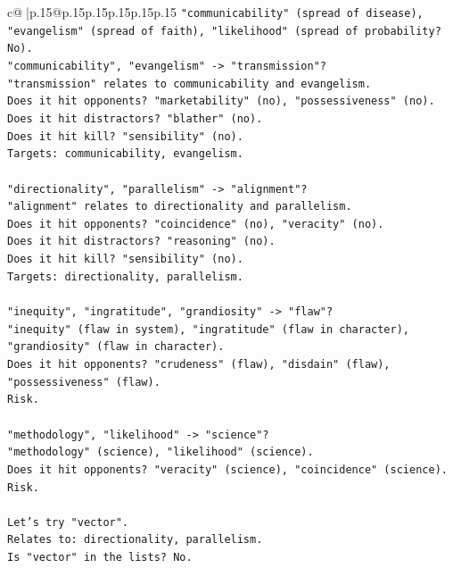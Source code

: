 \documentclass{article}
\begin{document}
{\begin{supertabular}{c@{$\;$}|p{.15\linewidth}@{}p{.15\linewidth}p{.15\linewidth}p{.15\linewidth}p{.15\linewidth}p{.15\linewidth}}
{{{\texttt{"communicability" (spread of disease), "evangelism" (spread of faith), "likelihood" (spread of probability? No).} \\
\texttt{"communicability", "evangelism" {-}> "transmission"?} \\
\texttt{"transmission" relates to communicability and evangelism.} \\
\texttt{Does it hit opponents? "marketability" (no), "possessiveness" (no).} \\
\texttt{Does it hit distractors? "blather" (no).} \\
\texttt{Does it hit kill? "sensibility" (no).} \\
\texttt{Targets: communicability, evangelism.} \\
\\ 
\texttt{"directionality", "parallelism" {-}> "alignment"?} \\
\texttt{"alignment" relates to directionality and parallelism.} \\
\texttt{Does it hit opponents? "coincidence" (no), "veracity" (no).} \\
\texttt{Does it hit distractors? "reasoning" (no).} \\
\texttt{Does it hit kill? "sensibility" (no).} \\
\texttt{Targets: directionality, parallelism.} \\
\\ 
\texttt{"inequity", "ingratitude", "grandiosity" {-}> "flaw"?} \\
\texttt{"inequity" (flaw in system), "ingratitude" (flaw in character), "grandiosity" (flaw in character).} \\
\texttt{Does it hit opponents? "crudeness" (flaw), "disdain" (flaw), "possessiveness" (flaw).} \\
\texttt{Risk.} \\
\\ 
\texttt{"methodology", "likelihood" {-}> "science"?} \\
\texttt{"methodology" (science), "likelihood" (science).} \\
\texttt{Does it hit opponents? "veracity" (science), "coincidence" (science).} \\
\texttt{Risk.} \\
\\ 
\texttt{Let's try "vector".} \\
\texttt{Relates to: directionality, parallelism.} \\
\texttt{Is "vector" in the lists? No.} \\
}}}
\end{supertabular}}
\end{document}
